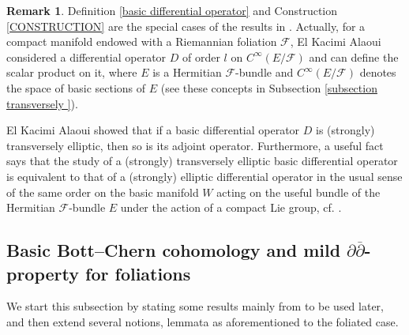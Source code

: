 \documentclass[12pt]{amsart}
\numberwithin{equation}{section}
\theoremstyle{definition}
\theoremstyle{definition}
\theoremstyle{definition}
\newtheorem{remark}  [theorem]     {Remark}
\renewcommand{\1}{\mathsf{1}}
\renewcommand{\>}{\rightarrow}
\newcommand{\p}{\partial}
\newcommand{\bp}{\overline\partial}
\def\p{\partial}
\def\mc{\mathcal}
\theoremstyle{plain} %
\theoremstyle{plain} %
\theoremstyle{plain} %
\begin{document}
	
	\begin{remark} \label{transformation} Definition \ref{basic differential operator} and Construction \ref{CONSTRUCTION} are the special cases of the results in \cite{EKA90}. Actually,  for a   compact manifold  endowed with a Riemannian foliation $\mc F$,  El Kacimi Alaoui considered a differential operator $D$ of order $l$ on $C^{\infty}(E / \mc F)$ and can define the scalar product on it, where $E$ is a Hermitian $\mc F$-bundle and $C^{\infty}(E / \mc F)$ denotes the space of basic sections of $E$ (see these concepts in Subsection \ref{subsection transversely }).
		
		El Kacimi Alaoui showed that  if a basic differential operator $D$ is (strongly) transversely elliptic, then so is its adjoint operator. Furthermore, a useful fact says that  the study of a (strongly) transversely elliptic basic differential operator is equivalent to that of  a  (strongly) elliptic differential operator in the usual sense of the same order on the basic manifold $W$ acting on the useful bundle of the Hermitian $\mc F$-bundle $E$ under the action of a compact Lie group, cf. \cite[Propositions 2.7.7, 2.7.8]{EKA90}.
	\end{remark}
	
	

	\subsection{Basic Bott--Chern cohomology and mild $\p\bp$-property for foliations}\label{subsection mild}
	We start this subsection by stating some results mainly from \cite{EKA90,EKAG97,Ra17} to be used later, and then extend several notions, lemmata  as aforementioned to the foliated case.
	
\end{document}

